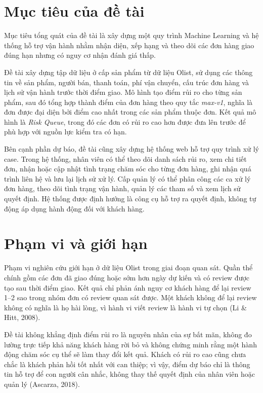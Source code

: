 \documentclass[12pt,a4paper]{report}
\begin{document}
\section{Mục tiêu của đề tài}
\label{sec:muc-tieu}

Mục tiêu tổng quát của đề tài là xây dựng một quy trình Machine Learning và hệ thống hỗ trợ vận hành nhằm nhận diện, xếp hạng và theo dõi các đơn hàng giao đúng hạn nhưng có nguy cơ nhận đánh giá thấp.

Đề tài xây dựng tập dữ liệu ở cấp sản phẩm từ dữ liệu Olist, sử dụng các thông tin về sản phẩm, người bán, thanh toán, phí vận chuyển, cấu trúc đơn hàng và lịch sử vận hành trước thời điểm giao. Mô hình tạo điểm rủi ro cho từng sản phẩm, sau đó tổng hợp thành điểm của đơn hàng theo quy tắc \emph{max-v1}, nghĩa là đơn được đại diện bởi điểm cao nhất trong các sản phẩm thuộc đơn. Kết quả mô hình là \emph{Risk Queue}, trong đó các đơn có rủi ro cao hơn được đưa lên trước để phù hợp với nguồn lực kiểm tra có hạn.

Bên cạnh phần dự báo, đề tài cũng xây dựng hệ thống web hỗ trợ quy trình xử lý case. Trong hệ thống, nhân viên có thể theo dõi danh sách rủi ro, xem chi tiết đơn, nhận hoặc cập nhật tình trạng chăm sóc cho từng đơn hàng, ghi nhận quá trình liên hệ và lưu lại lịch sử xử lý. Cấp quản lý có thể phân công các ca xử lý đơn hàng, theo dõi tình trạng vận hành, quản lý các tham số và xem lịch sử quyết định. Hệ thống được định hướng là công cụ hỗ trợ ra quyết định, không tự động áp dụng hành động đối với khách hàng.

\section{Phạm vi và giới hạn}
\label{sec:pham-vi}

Phạm vi nghiên cứu giới hạn ở dữ liệu Olist trong giai đoạn quan sát. Quần thể chính gồm các đơn đã giao đúng hoặc sớm hơn ngày dự kiến và có review được tạo sau thời điểm giao. Kết quả chỉ phản ánh nguy cơ khách hàng để lại review 1--2 sao trong nhóm đơn có review quan sát được. Một khách không để lại review không có nghĩa là họ hài lòng, vì hành vi viết review là hành vi tự chọn (Li \& Hitt, 2008).

Đề tài không khẳng định điểm rủi ro là nguyên nhân của sự bất mãn, không đo lường trực tiếp khả năng khách hàng rời bỏ và không chứng minh rằng một hành động chăm sóc cụ thể sẽ làm thay đổi kết quả. Khách có rủi ro cao cũng chưa chắc là khách phản hồi tốt nhất với can thiệp; vì vậy, điểm dự báo chỉ là thông tin hỗ trợ để con người cân nhắc, không thay thế quyết định của nhân viên hoặc quản lý (Ascarza, 2018).
\end{document}

